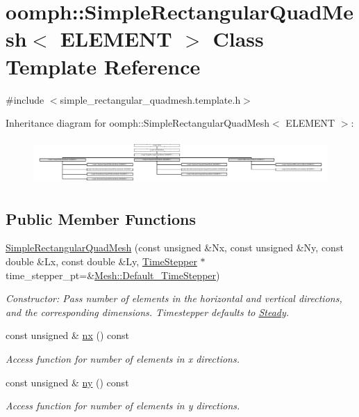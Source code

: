 \hypertarget{classoomph_1_1SimpleRectangularQuadMesh}{}\section{oomph\+:\+:Simple\+Rectangular\+Quad\+Mesh$<$ E\+L\+E\+M\+E\+NT $>$ Class Template Reference}
\label{classoomph_1_1SimpleRectangularQuadMesh}


{\ttfamily \#include $<$simple\+\_\+rectangular\+\_\+quadmesh.\+template.\+h$>$}

Inheritance diagram for oomph\+:\+:Simple\+Rectangular\+Quad\+Mesh$<$ E\+L\+E\+M\+E\+NT $>$\+:\begin{figure}[H]
\begin{center}
\leavevmode
\includegraphics[height=1.716475cm]{classoomph_1_1SimpleRectangularQuadMesh}
\end{center}
\end{figure}
\subsection*{Public Member Functions}
\begin{DoxyCompactItemize}
\item 
\hyperlink{classoomph_1_1SimpleRectangularQuadMesh_a8224b55f7d99a36debacb3f4cc293407}{Simple\+Rectangular\+Quad\+Mesh} (const unsigned \&Nx, const unsigned \&Ny, const double \&Lx, const double \&Ly, \hyperlink{classoomph_1_1TimeStepper}{Time\+Stepper} $\ast$time\+\_\+stepper\+\_\+pt=\&\hyperlink{classoomph_1_1Mesh_a12243d0fee2b1fcee729ee5a4777ea10}{Mesh\+::\+Default\+\_\+\+Time\+Stepper})
\begin{DoxyCompactList}\small\item\em Constructor\+: Pass number of elements in the horizontal and vertical directions, and the corresponding dimensions. Timestepper defaults to \hyperlink{classoomph_1_1Steady}{Steady}. \end{DoxyCompactList}\item 
const unsigned \& \hyperlink{classoomph_1_1SimpleRectangularQuadMesh_a4ff7678ec433180e2245ea2147f222b7}{nx} () const
\begin{DoxyCompactList}\small\item\em Access function for number of elements in x directions. \end{DoxyCompactList}\item 
const unsigned \& \hyperlink{classoomph_1_1SimpleRectangularQuadMesh_a45011f22dedd480392b1f376e4269921}{ny} () const
\begin{DoxyCompactList}\small\item\em Access function for number of elements in y directions. \end{DoxyCompactList}\end{DoxyCompactItemize}
